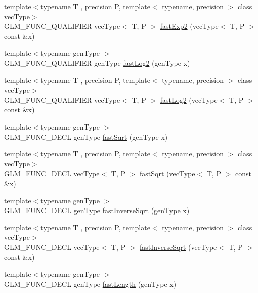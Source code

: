 \begin{DoxyCompactItemize}
\item 
{\footnotesize template$<$typename T , precision P, template$<$ typename, precision $>$ class vec\+Type$>$ }\\G\+L\+M\+\_\+\+F\+U\+N\+C\+\_\+\+Q\+U\+A\+L\+I\+F\+I\+E\+R vec\+Type$<$ T, P $>$ \hyperlink{group__gtx__fast__exponential_ga9e6219327b7a33077dbec7620d981fff}{fast\+Exp2} (vec\+Type$<$ T, P $>$ const \&x)
\item 
{\footnotesize template$<$typename gen\+Type $>$ }\\G\+L\+M\+\_\+\+F\+U\+N\+C\+\_\+\+Q\+U\+A\+L\+I\+F\+I\+E\+R gen\+Type \hyperlink{namespaceglm_ae4f91aa04733368c8e55da6e592005d8}{fast\+Log2} (gen\+Type x)
\item 
{\footnotesize template$<$typename T , precision P, template$<$ typename, precision $>$ class vec\+Type$>$ }\\G\+L\+M\+\_\+\+F\+U\+N\+C\+\_\+\+Q\+U\+A\+L\+I\+F\+I\+E\+R vec\+Type$<$ T, P $>$ \hyperlink{group__gtx__fast__exponential_gabc46086fe6636b8be87f09e6c5d2bb58}{fast\+Log2} (vec\+Type$<$ T, P $>$ const \&x)
\item 
{\footnotesize template$<$typename gen\+Type $>$ }\\G\+L\+M\+\_\+\+F\+U\+N\+C\+\_\+\+D\+E\+C\+L gen\+Type \hyperlink{group__gtx__fast__square__root_ga6c460e9414a50b2fc455c8f64c86cdc9}{fast\+Sqrt} (gen\+Type x)
\item 
{\footnotesize template$<$typename T , precision P, template$<$ typename, precision $>$ class vec\+Type$>$ }\\G\+L\+M\+\_\+\+F\+U\+N\+C\+\_\+\+D\+E\+C\+L vec\+Type$<$ T, P $>$ \hyperlink{group__gtx__fast__square__root_gaad9f601bbc3faa04dda384e4c4e1592c}{fast\+Sqrt} (vec\+Type$<$ T, P $>$ const \&x)
\item 
{\footnotesize template$<$typename gen\+Type $>$ }\\G\+L\+M\+\_\+\+F\+U\+N\+C\+\_\+\+D\+E\+C\+L gen\+Type \hyperlink{group__gtx__fast__square__root_ga7f081b14d9c7035c8714eba5f7f75a8f}{fast\+Inverse\+Sqrt} (gen\+Type x)
\item 
{\footnotesize template$<$typename T , precision P, template$<$ typename, precision $>$ class vec\+Type$>$ }\\G\+L\+M\+\_\+\+F\+U\+N\+C\+\_\+\+D\+E\+C\+L vec\+Type$<$ T, P $>$ \hyperlink{group__gtx__fast__square__root_ga903878071f92e51e551791e584a171a1}{fast\+Inverse\+Sqrt} (vec\+Type$<$ T, P $>$ const \&x)
\item 
{\footnotesize template$<$typename gen\+Type $>$ }\\G\+L\+M\+\_\+\+F\+U\+N\+C\+\_\+\+D\+E\+C\+L gen\+Type \hyperlink{group__gtx__fast__square__root_gafe697d6287719538346bbdf8b1367c59}{fast\+Length} (gen\+Type x)

\end{DoxyCompactItemize}
